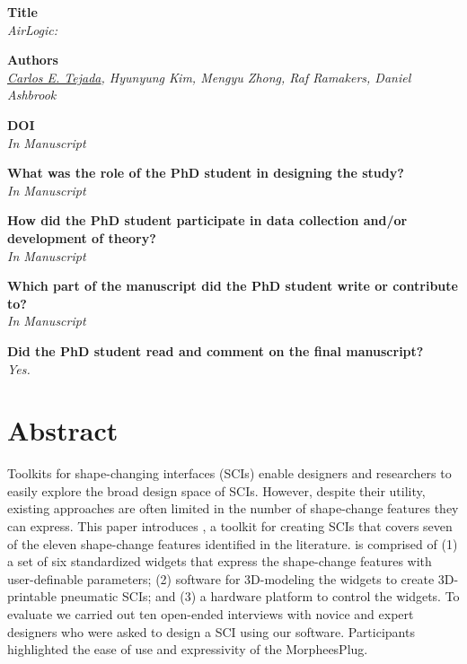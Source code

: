   \vfill

  \noindent
  \textbf{Title}\\
  \textit{AirLogic: }

  \bigskip

  \noindent
  \textbf{Authors}\\
  \textit{\underline{Carlos E. Tejada}, Hyunyung Kim, Mengyu Zhong, Raf Ramakers, Daniel Ashbrook}

  \bigskip

  \noindent
  \textbf{DOI}\\
  \textit{In Manuscript}

  \bigskip

  \noindent
  \textbf{What was the role of the PhD student in designing the study?}\\
  \textit{In Manuscript}

  \bigskip

  \noindent
  \textbf{How did the PhD student participate in data collection and/or development of theory?}\\
  \textit{In Manuscript}

  \bigskip

  \noindent
  \textbf{Which part of the manuscript did the PhD student write or contribute to?}\\
  \textit{In Manuscript}

  \bigskip

  \noindent
  \textbf{Did the PhD student read and comment on the final manuscript?}\\
  \textit{Yes.}

  \bigskip
  \vfill

  \newpage

  \section{Abstract}
    Toolkits for shape-changing interfaces (SCIs) enable designers and researchers
    to easily explore the broad design space of SCIs. However, despite their
    utility, existing approaches are often limited in the number of shape-change
    features they can express. This paper introduces \mp, a toolkit for creating
    SCIs that covers seven of the eleven shape-change features identified in the
    literature. \mp is comprised of (1) a set of six standardized widgets that
    express the shape-change features with user-definable parameters; (2) software
    for 3D-modeling the widgets to create 3D-printable pneumatic SCIs; and (3) a
    hardware platform to control the widgets. To evaluate \mp we carried out ten
    open-ended interviews with novice and expert designers who were asked to
    design a SCI using our software. Participants highlighted the ease of use and
    expressivity of the MorpheesPlug.

